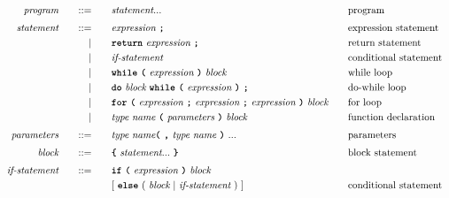 \documentclass[a4paper]{article}
\begin{document}
\addtolength{\jot}{-0.5mm}
\begin{alignat*}{9}
    && \textit{program}    &&\quad ::= &\quad && \textit{statement} ... && \textrm{program} \\[1mm]
    && \textit{statement}  &&\quad ::= &\quad && \textit{expression} \ \textbf{\texttt{;}} && \textrm{expression statement} \\
	&&                       && |   &\quad && \textbf{\texttt{return}}\  \textit{expression} \ \textbf{\texttt{;}} && \textrm{return statement}\\
	&&                       && |   &\quad && \textit{if-statement} \quad && \textrm{conditional statement}\\
	&&                       && |   &\quad && \textbf{\texttt{while}}\  \textbf{\texttt{(}}\  \textit{expression} \ \textbf{\texttt{)}} \ \textit{block} && \textrm{while loop}\\
	&&						 && |	&\quad && \textbf{\texttt{do}} \ \textit{block} \ \textbf{\texttt{while}}\  \textbf{\texttt{(}}\  \textit{expression} \ \textbf{\texttt{)}} \ \textbf{\texttt{;}} && \textrm{do-while loop}\\
	&&						 && | 	 &\quad && \textbf{\texttt{for}}\  \textbf{\texttt{(}}\  \textit{expression} \ \textbf{\texttt{;}} \ \textit{expression} \ \textbf{\texttt{;}} \ \textit{expression} \ \textbf{\texttt{)}} \ \textit{block} \ \ \  && \textrm{for loop}\\
	&&						&& 	| &\quad && \textit{type}\  \textit{name} \ \textbf{\texttt{(}}\  \textit{parameters} \ \textbf{\texttt{)}}\ \textit{block} \quad && \textrm{function declaration}\\[1mm]
	&& \textit{parameters}    &&\quad ::= &\quad && \textit{type}\  \textit{name} \textbf{\texttt{(}}\  \textbf{\texttt{,}}\ \textit{type}\  \textit{name} \ \textbf{\texttt{)}}\ ... && \textrm{parameters} \\[1mm]
	&& \textit{block}         &&\quad ::= &\quad && \textbf{\texttt{\{}}\  \textit{statement} ... \ \textbf{\texttt{\}}} \quad && \textrm{block statement} \\[1mm]
	&& \textit{if-statement} && ::= &\quad &&  \textbf{\texttt{if}}\
                                   \textbf{\texttt{(}}\ \textit{expression} \ \textbf{\texttt{)}}\ 
                                   \textit{block} \\
&&                       &&     &      && [ \ \textbf{\texttt{else}}\
                                          (\ \textit{block}
                                          \ | \
                                          \textit{if-statement} \ )\ ]
                                                            && \textrm{conditional statement} \\[1mm]
\end{alignat*}
\end{document}
